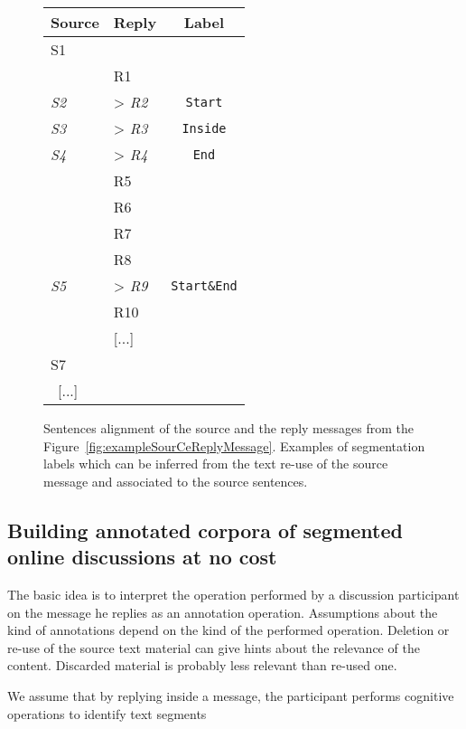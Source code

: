 \begin{figure}\small\centering
\begin{tabular}{*{2}{|l}|c|}
\toprule
\textbf{Source} & \textbf{Reply} & \textbf{Label}\\
	\midrule
S1  & & \\
    & R1 & \\
\textit{S2}  & > \textit{R2}& \texttt{Start}\\
\textit{S3}  & > \textit{R3}& \texttt{Inside}\\
\textit{S4}  & > \textit{R4}& \texttt{End}\\
    & R5 & \\
    & R6 & \\
    & R7 & \\
    & R8 & \\
\textit{S5}  & > \textit{R9} & \texttt{Start\&End}\\
    & R10 & \\
    & [...] & \\
S7    &  & \\ \ 
[...] \    &  & \\
	\bottomrule
\end{tabular}

\caption{Sentences alignment of the source and the reply messages from the Figure~\ref{fig:exampleSourCeReplyMessage}. Examples of segmentation labels which can be inferred from the text re-use of the source message and associated to the source sentences.}
\label{fig:exampleSegmentationLabels}
\end{figure}


\subsection{Building annotated corpora of segmented online discussions at no cost}
\label{}

The basic idea is to interpret the operation performed by a discussion participant on the message he replies as an annotation operation. 
Assumptions about the kind of annotations depend on the kind of the performed operation.
Deletion or re-use of the source text material can give hints about the relevance of the content. Discarded material is probably less relevant than re-used one.

We assume that by replying inside a message, the participant performs cognitive operations to identify text segments 

